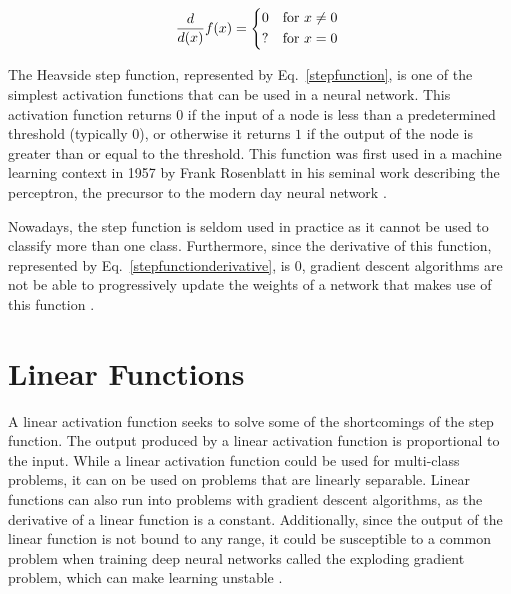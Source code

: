 \begin{equation}\label{stepfunctionderivative}
    \frac{d}{d(x)}f(x) =
      \begin{dcases*}
                                       0 & \text{for \(x \neq 0\)} \\
                                       ? & \text{for \(x = 0\)} \\
      \end{dcases*}
\end{equation}

The Heavside step function, represented by Eq.~\ref{stepfunction}, is one of the simplest activation functions that can be used in a neural network. This activation function returns $0$ if the input of a node is less than a predetermined threshold (typically $0$), or otherwise it returns $1$ if the output of the node is greater than or equal to the threshold. This function was first used in a machine learning context in 1957 by Frank Rosenblatt in his seminal work describing the perceptron, the precursor to the modern day neural network \citep{rosenblatt1957perceptron}. 

Nowadays, the step function is seldom used in practice as it cannot be used to classify more than one class. Furthermore, since the derivative of this function, represented by Eq.~\ref{stepfunctionderivative}, is $0$, gradient descent algorithms are not be able to progressively update the weights of a network that makes use of this function \citep{Snyman2005}.

\section{Linear Functions}\label{sec:linear-function}

A linear activation function seeks to solve some of the shortcomings of the step function. The output produced by a linear activation function is proportional to the input. While a linear activation function could be used for multi-class problems, it can on be used on problems that are linearly separable. Linear functions can also run into problems with gradient descent algorithms, as the derivative of a linear function is a constant. Additionally, since the output of the linear function is not bound to any range, it could be susceptible to a common problem when training deep neural networks called the exploding gradient problem, which can make learning unstable \citep{goodfellow2016deeplearning}.

